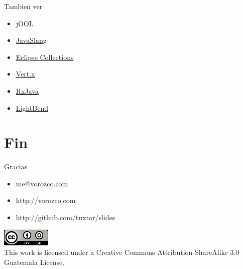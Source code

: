 \documentclass{beamer}
\begin{document}
\begin{frame}{Tambien ver}
    \begin{itemize}
        \item \href{https://github.com/jOOQ/jOOL}{jOOL}
        \item \href{http://www.javaslang.io/}{JavaSlang}
        \item \href{https://projects.eclipse.org/proposals/eclipse-collections}{Eclipse Collections}
        
        \item \href{http://vertx.io/}{Vert.x}
        \item \href{https://github.com/ReactiveX/RxJava}{RxJava}
        \item \href{https://www.lightbend.com/}{LightBend}
    \end{itemize}
\end{frame}


\section{Fin}
\begin{frame}{Gracias}
\begin{itemize}
\item me@vorozco.com
\item http://vorozco.com
\item http://github.com/tuxtor/slides
\end{itemize}
\begin{center}
\includegraphics[width=0.1\linewidth]{Images/cclogo}
\\
This work is licensed under a Creative Commons Attribution-ShareAlike 3.0 Guatemala License.
\end{center}
\end{frame}
\end{document}
